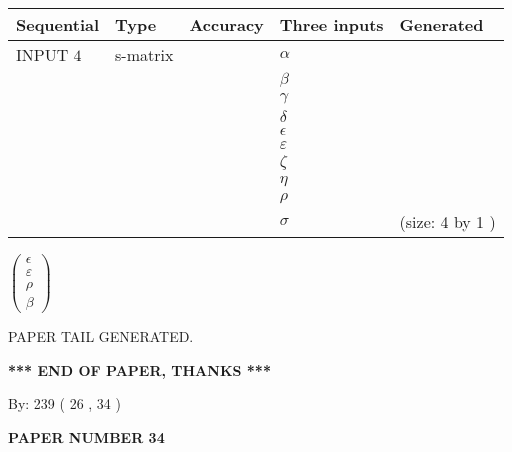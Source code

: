 \documentclass[12pt]{article}
\begin{document}
  
\noindent\begin{tabular}{|l|l|l|l|l|}
\hline
 Sequential & Type & Accuracy & Three inputs & Generated \\ 
\hline
 
 
  INPUT $            4 $ & s-matrix & & 
 $  \alpha $ & 
  \\
  & & & 
 $  \beta $ & 
  \\
  & & & 
 $  \gamma $ & 
  \\
  & & & 
 $  \delta $ & 
  \\
  & & & 
 $  \epsilon $ & 
  \\
  & & & 
 $  \varepsilon $ & 
  \\
  & & & 
 $                     \zeta $ & 
  \\
  & & & 
 $  \eta $ & 
  \\
  & & & 
 $  \rho $ & 
  \\
  & & & 
 $  \sigma $ & 
  (size:            4  by            1 )
 \\  \hline  
 \end{tabular}
   
   
 $  \left( \begin{array}
 {
 c
 }
 \epsilon \\ 
 \varepsilon \\ 
 \rho \\ 
 \beta
 \end{array} \right) $ 
   
   
   
   
 \vspace{0.2in}
 
   
   
\vspace{2.0in} PAPER TAIL GENERATED.
   
   
   
   
\vspace{1.0in} 
{\textbf{\large{ *** END OF PAPER, THANKS *** }}} 
   
   
\hspace{1.0in} By: 
         239 (          26 ,           34 )
   
   
   
   
\newpage 
\setcounter{page}{ 
    34001 } 
   
   
   
   
 {\textbf{ \Large{ PAPER NUMBER           34  }}}
   
   
\vspace{0.2in}
   
\end{document}
